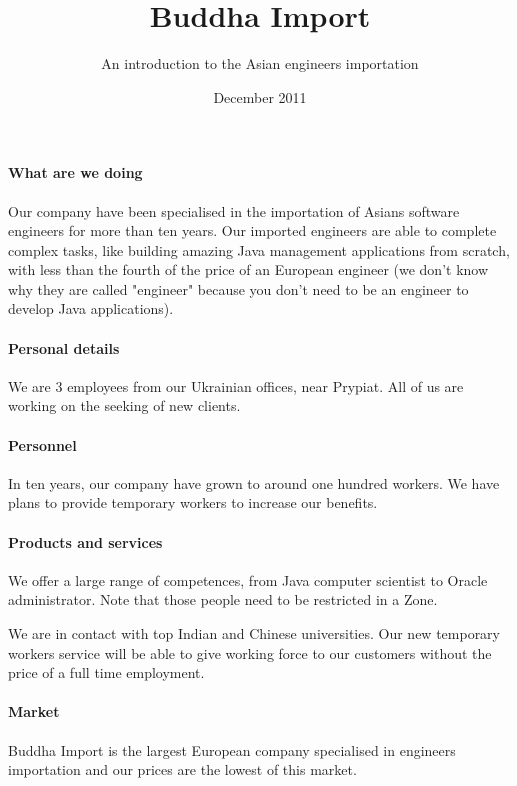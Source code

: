 \documentclass[a4paper,12pt]{article}
\title{Buddha Import}
\author{An introduction to the Asian engineers importation}
\date{December 2011}
\begin{document}
\maketitle 

\paragraph{What are we doing}
Our company have been specialised in the importation of Asians software
engineers for more than ten years. Our imported engineers are able to complete
complex tasks, like building amazing Java management applications from scratch,
with less than the fourth of the price of an European engineer (we don't know
why they are called "engineer" because you don't need to be an engineer to
develop Java applications).

\paragraph{Personal details}
We are 3 employees from our Ukrainian offices, near Prypiat. All of us are
working on the seeking of new clients.

\paragraph{Personnel}
In ten years, our company have grown to around one hundred workers. We have
plans to provide temporary workers to increase our benefits.


\paragraph{Products and services}
We offer a large range of competences, from Java computer scientist to Oracle
administrator. Note that those people need to be restricted in a Zone.

We are in contact with top Indian and Chinese universities. Our
new temporary workers service will be able to give working force to our
customers without the price of a full time employment. 

\paragraph{Market}
Buddha Import is the largest European company specialised in engineers
importation and our prices are the lowest of this market.
\end{document}
